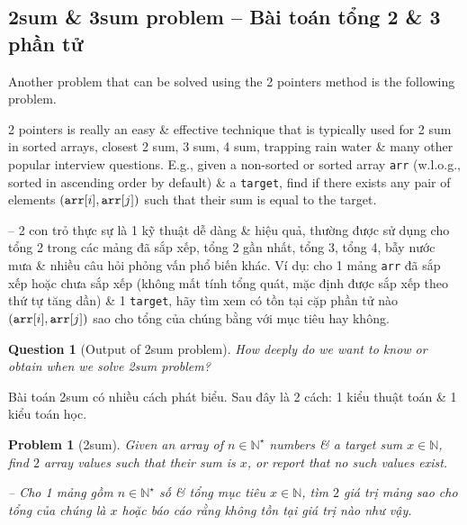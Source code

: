 \documentclass{article}
\newtheorem{problem}{Problem}
\newtheorem{question}{Question}
\begin{document}

\subsection{{\sc2sum} \& {\sc3sum} problem -- Bài toán tổng 2 \& 3 phần tử}
Another problem that can be solved using the 2 pointers method is the following {} problem.

2 pointers is really an easy \& effective technique that is typically used for 2 sum in sorted arrays, closest 2 sum, 3 sum, 4 sum, trapping rain water \& many other popular interview questions. E.g., given a non-sorted or sorted array {\tt arr} (w.l.o.g., sorted in ascending order by default) \& a {\tt target}, find if there exists any pair of elements $({\tt arr}[i],{\tt arr}[j])$ such that their sum is equal to the target.

-- 2 con trỏ thực sự là 1 kỹ thuật dễ dàng \& hiệu quả, thường được sử dụng cho tổng 2 trong các mảng đã sắp xếp, tổng 2 gần nhất, tổng 3, tổng 4, bẫy nước mưa \& nhiều câu hỏi phỏng vấn phổ biến khác. Ví dụ: cho 1 mảng {\tt arr} đã sắp xếp hoặc chưa sắp xếp (không mất tính tổng quát, mặc định được sắp xếp theo thứ tự tăng dần) \& 1 {\tt target}, hãy tìm xem có tồn tại cặp phần tử nào $({\tt arr}[i],{\tt arr}[j])$ sao cho tổng của chúng bằng với mục tiêu hay không.

\begin{question}[Output of {\sf2sum} problem]
    How deeply do we want to know or obtain when we solve {\sc2sum} problem?
\end{question}
Bài toán {\sc2sum} có nhiều cách phát biểu. Sau đây là 2 cách: 1 kiểu thuật toán \& 1 kiểu toán học.

\begin{problem}[{\sc2sum}]
    Given an array of $n\in\mathbb{N}^\star$ numbers \& a target sum $x\in\mathbb{N}$, find $2$ array values such that their sum is $x$, or report that no such values exist.

    -- Cho 1 mảng gồm $n\in\mathbb{N}^\star$ số \& tổng mục tiêu $x\in\mathbb{N}$, tìm $2$ giá trị mảng sao cho tổng của chúng là $x$ hoặc báo cáo rằng không tồn tại giá trị nào như vậy.
\end{problem}

\begin{center}
\end{center}
\end{document}

